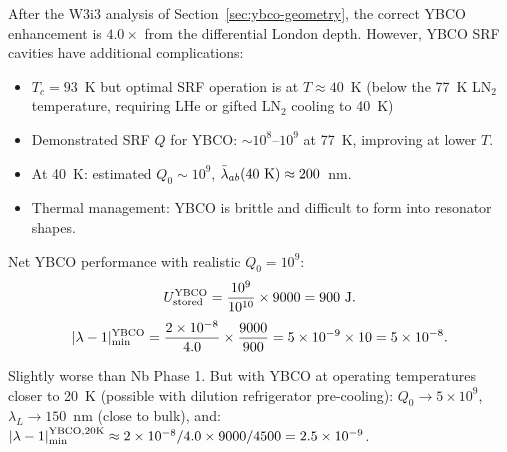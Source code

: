 \documentclass[11pt]{article}
\newcommand{\ee}[1]{\times 10^{#1}}
\newcommand{\lam}{\lambda}
\begin{document}
After the W3i3 analysis of Section~\ref{sec:ybco-geometry}, the correct
YBCO enhancement is $4.0\times$ from the differential London depth.
However, YBCO SRF cavities have additional complications:
\begin{itemize}
\item $T_c = 93$~K but optimal SRF operation is at $T \approx 40$~K (below
the 77~K LN$_2$ temperature, requiring LHe or gifted LN$_2$ cooling to 40~K)
\item Demonstrated SRF $Q$ for YBCO: $\sim 10^8$--$10^9$ at 77~K, improving
at lower $T$.
\item At 40~K: estimated $Q_0 \sim 10^9$, $\bar{\lambda}_{ab}(40~{\rm K}) \approx 200$~nm.
\item Thermal management: YBCO is brittle and difficult to form into resonator shapes.
\end{itemize}

Net YBCO performance with realistic $Q_0 = 10^9$:
\begin{equation}
U_{\rm stored}^{\rm YBCO} = \frac{10^9}{10^{10}} \times 9000 = 900~{\rm J}.
\end{equation}
\begin{equation}
|\lam-1|_{\rm min}^{\rm YBCO} = \frac{2\ee{-8}}{4.0} \times \frac{9000}{900}
= 5\ee{-9} \times 10 = 5\ee{-8}.
\end{equation}

Slightly worse than Nb Phase 1. But with YBCO at operating temperatures
closer to 20~K (possible with dilution refrigerator pre-cooling):
$Q_0 \to 5\ee{9}$, $\lambda_L \to 150$~nm (close to bulk), and:
$|\lam-1|_{\rm min}^{\rm YBCO,20K} \approx 2\ee{-8}/4.0 \times 9000/4500 = 2.5\ee{-9}$.
\end{document}
